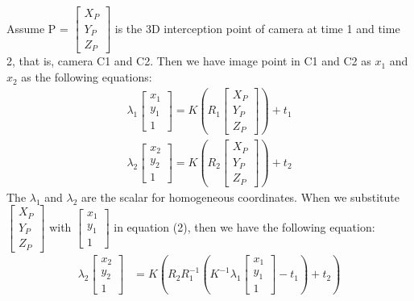 \begin{your_solution}[title=Q1.3,height=17cm,width=\linewidth]
Assume P = $\begin{bmatrix} X_P \\ Y_P \\ Z_P \end{bmatrix}$ is the 3D interception point of camera at time 1 and time 2, that is, camera C1 and C2. Then we have image point in C1 and C2 as $x_1$ and $x_2$ as the following equations:
\begin{align}
	\lambda_1 \begin{bmatrix} x_1 \\ y_1 \\ 1 \end{bmatrix} = K(R_1 \begin{bmatrix} X_P \\ Y_P \\ Z_P \end{bmatrix}) + t_1 \\
	\lambda_2 \begin{bmatrix} x_2 \\ y_2 \\ 1 \end{bmatrix} = K(R_2 \begin{bmatrix} X_P \\ Y_P \\ Z_P \end{bmatrix}) + t_2
\end{align}
The $\lambda_1$ and $\lambda_2$ are the scalar for homogeneous coordinates. When we substitute $\begin{bmatrix} X_P \\ Y_P \\ Z_P \end{bmatrix}$ with $\begin{bmatrix} x_1 \\ y_1 \\ 1 \end{bmatrix}$ in equation (2), then we have the following equation:
\begin{equation}
\begin{split}
	\lambda_2 \begin{bmatrix} x_2 \\ y_2 \\ 1 \end{bmatrix} &= K(R_2 R_1^{-1} (K^{-1} \lambda_1 \begin{bmatrix} x_1 \\ y_1 \\ 1 \end{bmatrix} - t_1) + t_2) \\

\end{split}
\end{equation}
\end{your_solution}
